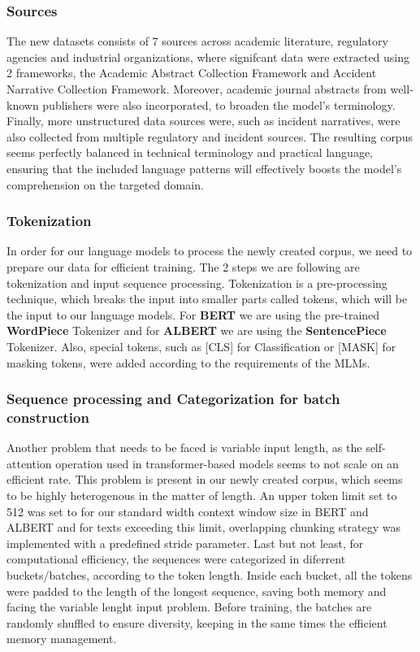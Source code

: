 \documentclass[a4paper,12pt]{article}
\begin{document}
\subsubsection{Sources}
The new datasets consists of 7 sources across academic literature, regulatory agencies and industrial organizations, where signifcant data were extracted using 2 frameworks, the Academic Abstract Collection Framework and Accident Narrative Collection Framework. Moreover, academic journal abstracts from well-known publishers were also incorporated, to broaden the model's terminology. Finally, 
more unstructured data sources were, such as incident narratives, were also collected from multiple regulatory and incident sources. The resulting corpus seems perfectly balanced in technical terminology and practical language, ensuring that the included language patterns will effectively boosts the model's comprehension on the targeted domain.

\subsubsection{Tokenization}
In order for our language models to process the newly created corpus, we need to prepare our data for efficient training. The 2 steps we are following are tokenization and input sequence processing. Tokenization is a pre-processing technique, which breaks the input into smaller parts called tokens, which will be the input to our language models. For \textbf{BERT} we are using the pre-trained \textbf{WordPiece} Tokenizer
and for \textbf{ALBERT} we are using the \textbf{SentencePiece} Tokenizer. Also, special tokens, such as [CLS] for Classification or [MASK] for masking tokens, were added according to the requirements of the MLMs.

\subsubsection{Sequence processing and Categorization for batch construction}
Another problem that needs to be faced is variable input length, as the self-attention operation used in transformer-based models seems to not scale on an efficient rate. This problem is present in our newly created corpus, which seems to be highly heterogenous in the matter of length. An upper token limit set to 512 was set to for our standard width context window size in BERT and ALBERT and for texts exceeding this limit, 
overlapping chunking strategy was implemented with a predefined stride parameter. Last but not least, for computational efficiency, the sequences were categorized in diferrent buckets/batches, according to the token length. Inside each bucket, all the tokens were padded to the length of the longest sequence, saving both memory and facing the variable lenght input problem. Before training, the batches are randomly shuffled to ensure diversity,
keeping in the same times the efficient memory management.
\end{document}
